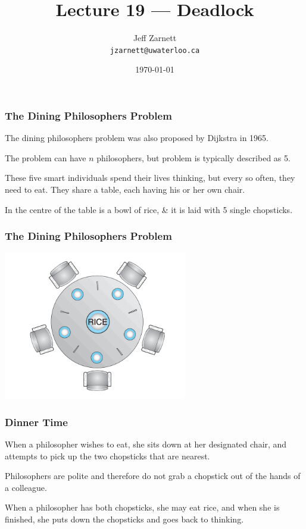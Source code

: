 

\title{Lecture 19 --- Deadlock }

\author{Jeff Zarnett \\ \small \texttt{jzarnett@uwaterloo.ca}}
\date{\today}




\begin{frame}
  \titlepage

 \end{frame}

\begin{frame}
\frametitle{The Dining Philosophers Problem}

The dining philosophers problem was also proposed by Dijkstra in 1965. 

The problem can have $n$ philosophers, but problem is typically described as 5. 

 These five smart individuals spend their lives thinking, but every so often, they need to eat. They share a table, each having his or her own chair. 
 
In the centre of the table is a bowl of rice, \& it is laid with 5 single chopsticks. 

\end{frame}

\begin{frame}
\frametitle{The Dining Philosophers Problem}

\begin{center}
\includegraphics[width=0.6\textwidth]{images/philosopher-table.png}
\end{center}

\end{frame}

\begin{frame}
\frametitle{Dinner Time}

When a philosopher wishes to eat, she sits down at her designated chair, and attempts to pick up the two chopsticks that are nearest. 

Philosophers are polite and therefore do not grab a chopstick out of the hands of a colleague.

 When a philosopher has both chopsticks, she may eat rice, and when she is finished, she puts down the chopsticks and goes back to thinking.


\end{frame}

